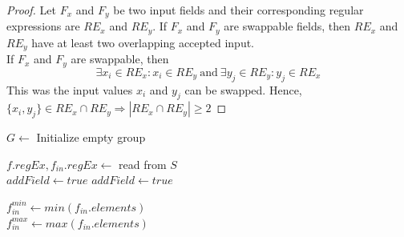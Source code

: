 \begin{proof}
  Let $F_x$ and $F_y$ be two input fields and their corresponding regular expressions are $RE_x$ and $RE_y$. If $F_x$ and $F_y$ are swappable fields, then $RE_x$ and $RE_y$ have at least two overlapping accepted input.
  \\
  If $F_x$ and $F_y$ are swappable, then 
  $$\exists x_i \in RE_x : x_i \in RE_y\ \text{and}\ \exists y_j \in RE_y : y_j \in RE_x$$ 
  This was the input values $x_i$ and $y_j$ can be swapped.
  Hence, $\{x_i, y_j\} \in RE_x \cap RE_y \Rightarrow |RE_x \cap RE_y| \geq 2$ 
\end{proof}

\begin{algorithm}[!htpb]
\footnotesize
\DontPrintSemicolon
{}
    $G\leftarrow$ Initialize empty group\\
     {
         {
                $f.regEx, f_{in}.regEx \leftarrow$ read from $S$\\        
                 {       
                     {  \label{algo:makeGroup:regEx}   
                        $addField \leftarrow true$ 
                     }
                      { 
                             { \label{algo:makeGroup:member} 
                             $addField \leftarrow true$ 
                         }
                     }  
                }
                 {
                     {\label{algo:makeGroup:menuNum} 
                    
                        $f_{in}^{min} \leftarrow min(f_{in}.elements)$\\
                        $f_{in}^{max} \leftarrow max(f_{in}.elements)$\\
                    }
                    
}}}
\end{algorithm}
